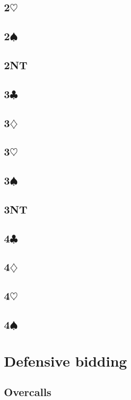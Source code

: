 \documentclass[10pt]{article}
\renewcommand{\c}{$\clubsuit$}
\renewcommand{\d}{$\diamondsuit$}
\newcommand{\h}{$\heartsuit$}
\newcommand{\s}{$\spadesuit$}
\newcommand{\pdfc}{\texorpdfstring{\c{}}{C}}
\newcommand{\pdfd}{\texorpdfstring{\d{}}{D}}
\newcommand{\pdfh}{\texorpdfstring{\h{}}{H}}
\newcommand{\pdfs}{\texorpdfstring{\s{}}{S}}
\begin{document}
\begin{multicols*}{2}
\subsection{2\pdfh}
\subsection{2\pdfs}
\subsection{2NT}
\subsection{3\pdfc}
\subsection{3\pdfd}
\subsection{3\pdfh}
\subsection{3\pdfs}
\subsection{3NT}
\subsection{4\pdfc}
\subsection{4\pdfd}
\subsection{4\pdfh}
\subsection{4\pdfs}

\section{Defensive bidding}
\subsection{Overcalls}


\end{multicols*}
\end{document}
